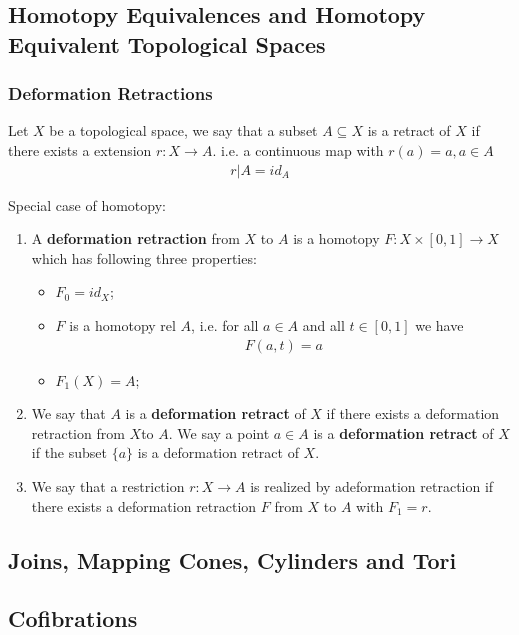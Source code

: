 \documentclass[Total.tex]{subfiles}
\begin{document}
			\subsection{Homotopy Equivalences and Homotopy Equivalent Topological Spaces}
				\subsubsection{Deformation Retractions}
				\begin{Def}
					Let $X$ be a topological space, we say that a subset $A\subseteq X$ is a retract of $X$ if there exists a extension $r:X\rightarrow A$. i.e. a continuous map with $r(a)=a,a\in A$
					\begin{gather*}
						r|A=id_A
					\end{gather*}
				\end{Def}
				Special case of homotopy:
				\begin{Def}
					\begin{enumerate}
						\item A \textbf{deformation retraction} from $X$ to $A$ is a  homotopy $F:X\times [0,1]\rightarrow X$ which has following three properties:
						\begin{itemize}
							\item $F_0=id_X$;
							\item $F$ is a homotopy rel $A$, i.e. for all $a\in A$ and all $t\in [0,1]$ we have
							\begin{gather*}
								F(a,t)=a
							\end{gather*}
							\item $F_1(X)=A$;
						\end{itemize}
						\item We say that $A$ is a \textbf{deformation retract} of $X$ if there exists a deformation retraction from $X$to $A$. We say a point $a\in A$ is a \textbf{deformation retract} of $X$ if the subset $\{a\}$ is a deformation retract of $X$.
						\item We say that a restriction $r:X\rightarrow A$ is realized by adeformation retraction if there exists a deformation retraction $F$ from $X$ to $A$ with $F_1=r$.
					\end{enumerate}
				\end{Def}
			\subsection{Joins, Mapping Cones, Cylinders and Tori}
			\subsection{Cofibrations}
\end{document}
